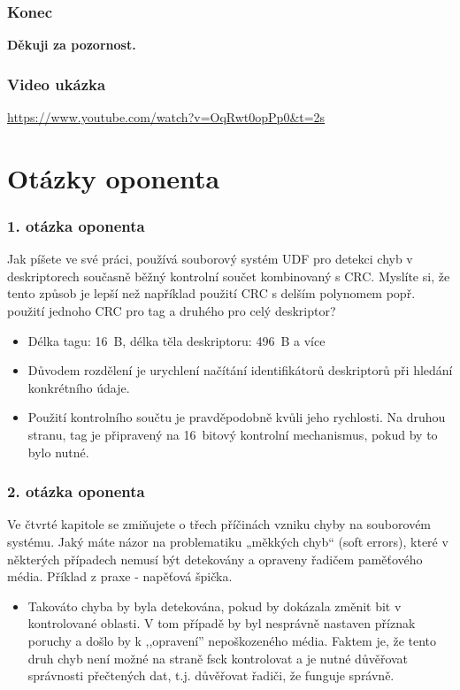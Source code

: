 \documentclass[aspectratio=169]{beamer}
\begin{document}
		\begin{frame}
			\frametitle{Konec}
			\center
			\vspace{40 pt}
			\Huge\textbf{Děkuji za pozornost.}
		\end{frame}

    \appendix 
    \setcounter{showProgressBar}{0}
        \begin{frame}
            \frametitle{Video ukázka}
            \center
            \large\url{https://www.youtube.com/watch?v=OqRwt0opPp0&t=2s}
        \end{frame}
    \section{Otázky oponenta}
        \begin{frame}
            \frametitle{1. otázka oponenta}
            \vspace{40pt}
            \large
            Jak píšete ve své práci, používá souborový systém UDF pro detekci chyb v deskriptorech současně běžný kontrolní součet kombinovaný s CRC. Myslíte si, že tento způsob je lepší než například použití CRC s delším polynomem popř. použití jednoho CRC pro tag a druhého pro celý deskriptor?
            \vspace{15pt}
            \begin{itemize}
                \item Délka tagu: 16~B, délka těla deskriptoru: 496~B a více
                \item Důvodem rozdělení je urychlení načítání identifikátorů deskriptorů při hledání konkrétního údaje.
                \item Použití kontrolního součtu je pravděpodobně kvůli jeho rychlosti. Na druhou stranu, tag je připravený na 16~bitový kontrolní mechanismus, pokud by to bylo nutné.
            \end{itemize}
        \end{frame}
        \begin{frame}
            \frametitle{2. otázka oponenta}
            \vspace{40pt}
            \large
            Ve čtvrté kapitole se zmiňujete o třech příčinách vzniku chyby na souborovém systému. Jaký máte názor na problematiku „měkkých chyb“ (soft errors), které v některých případech nemusí být detekovány a opraveny řadičem paměťového média. Příklad z praxe - napěťová špička.
            \vspace{15pt}
            \begin{itemize}
                \item Takováto chyba by byla detekována, pokud by dokázala změnit bit v kontrolované oblasti. V tom případě by byl nesprávně nastaven příznak poruchy a došlo by k ,,opravení'' nepoškozeného média. Faktem je, že tento druh chyb není možné na straně fsck kontrolovat a je nutné důvěřovat správnosti přečtených dat, t.j. důvěřovat řadiči, že funguje správně.
            \end{itemize}
        \end{frame}
\end{document}
